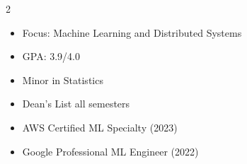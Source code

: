 \documentclass[10pt,a4paper,ragged2e,withhyper]{altacv}
\begin{document}
\begin{paracol}{2}
\begin{itemize}
  \item Focus: Machine Learning and Distributed Systems
  \item GPA: 3.9/4.0
\end{itemize}

\divider

\begin{itemize}
  \item Minor in Statistics
  \item Dean's List all semesters
\end{itemize}



\divider



\begin{itemize}
  \item AWS Certified ML Specialty (2023)
  \item Google Professional ML Engineer (2022)
\end{itemize}

\end{paracol}
\end{document}
